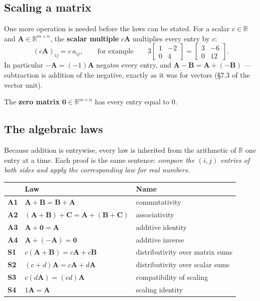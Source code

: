 \documentclass[11pt]{article}
\theoremstyle{plain}
\theoremstyle{definition}
\theoremstyle{remark}
\newcommand{\R}{\mathbb{R}}
\newcommand{\mt}[1]{\mathbf{#1}}        %
\begin{document}
\subsection{Scaling a matrix}
One more operation is needed before the laws can be stated. For a scalar
$c\in\R$ and $\mt{A}\in\R^{m\times n}$, the \textbf{scalar multiple} $c\mt{A}$
multiplies every entry by $c$:
\[
  (c\mt{A})_{ij}=c\,a_{ij},
  \qquad\text{for example}\qquad
  3\begin{bmatrix}1&-2\\0&4\end{bmatrix}
  =\begin{bmatrix}3&-6\\0&12\end{bmatrix} .
\]
In particular $-\mt{A}=(-1)\mt{A}$ negates every entry, and
$\mt{A}-\mt{B}=\mt{A}+(-\mt{B})$ --- subtraction is addition of the negative,
exactly as it was for vectors (\S7.3 of the vector unit).

The \textbf{zero matrix} $\mt{0}\in\R^{m\times n}$ has every entry equal to $0$.

\subsection{The algebraic laws}
Because addition is entrywise, every law is inherited from the arithmetic of
$\R$ one entry at a time. Each proof is the same sentence: \emph{compare the
$(i,j)$ entries of both sides and apply the corresponding law for real
numbers.}

\begin{center}
\renewcommand{\arraystretch}{1.45}
\begin{tabular}{@{}l l l@{}}
\toprule
 & \textbf{Law} & \textbf{Name} \\
\midrule
\textbf{A1} & $\mt{A}+\mt{B}=\mt{B}+\mt{A}$
            & commutativity \\
\textbf{A2} & $(\mt{A}+\mt{B})+\mt{C}=\mt{A}+(\mt{B}+\mt{C})$
            & associativity \\
\textbf{A3} & $\mt{A}+\mt{0}=\mt{A}$
            & additive identity \\
\textbf{A4} & $\mt{A}+(-\mt{A})=\mt{0}$
            & additive inverse \\
\midrule
\textbf{S1} & $c(\mt{A}+\mt{B})=c\mt{A}+c\mt{B}$
            & distributivity over matrix sums \\
\textbf{S2} & $(c+d)\mt{A}=c\mt{A}+d\mt{A}$
            & distributivity over scalar sums \\
\textbf{S3} & $c(d\mt{A})=(cd)\mt{A}$
            & compatibility of scaling \\
\textbf{S4} & $1\mt{A}=\mt{A}$
            & scaling identity \\
\bottomrule
\end{tabular}
\end{center}
\end{document}
